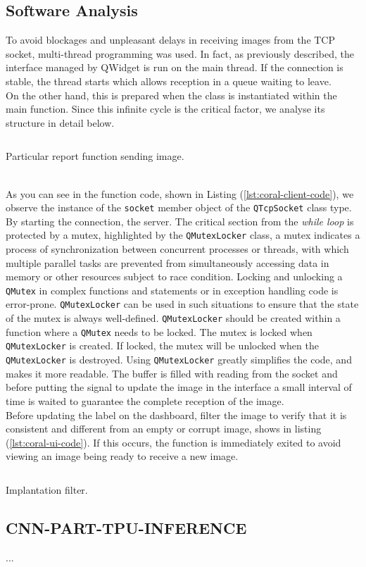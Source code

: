 \subsection{Software Analysis}
\label{ssec:software-coral-analysis}
To avoid blockages and unpleasant delays in receiving images from the TCP
socket, multi-thread programming was used. In fact, as previously described, the
interface managed by QWidget is run on the main thread. If the connection is
stable, the thread starts which allows reception in a queue waiting to leave.\\ 
On the other hand, this is prepared when the class is instantiated within the
main function. Since this infinite cycle is the critical factor, we analyse its
structure in detail below.
%
\begin{listing}[ht] 
\inputminted[frame=lines,framesep=2mm, linenos=true, autogobble, breaklines=true, fontsize=\scriptsize, firstline=12, lastline=26]{c++}{software/code/streamerthread.cpp} 
\caption{Particular report function sending image.} 
\label{lst:coral-client-code} 
\end{listing}
%
\\As you can see in the function code, shown in Listing
(\ref{lst:coral-client-code}), we observe the instance of the \texttt{socket}
member object of the \texttt{QTcpSocket} class type. 
By starting the connection, the server. 
The critical section from the \emph{while loop} is protected by a mutex,
highlighted by the \texttt{QMutexLocker} class, a mutex indicates a
process of synchronization between concurrent processes or threads, with which
multiple parallel tasks are prevented from simultaneously accessing 
data in memory or other resources subject to race condition.\cite{wiki:mutex} \hfill \break
Locking and unlocking a \texttt{QMutex} in complex functions and statements or
in exception handling code is error-prone.
\texttt{QMutexLocker} can be used in such situations to ensure that the state of the
mutex is always well-defined. \texttt{QMutexLocker} should be created within a
function where a \texttt{QMutex} needs to be locked. The mutex is locked when
\texttt{QMutexLocker} is created. If locked, the mutex will be unlocked when
the \texttt{QMutexLocker} is destroyed.
Using \texttt{QMutexLocker} greatly simplifies the code, and makes it more
readable.\cite{Qt:QMutexclass} \hfill \break
The buffer is filled with reading from the socket and before putting the signal
to update the image in the interface a small interval of time is waited to
guarantee the complete reception of the image.\\
Before updating the label on the dashboard, filter the image to verify that it
is consistent and different from an empty or corrupt image, shows in listing
(\ref{lst:coral-ui-code}). 
If this occurs, the function is immediately exited to
avoid viewing an image being ready to receive a new image. 
%
\begin{listing}[ht] 
\inputminted[frame=lines,framesep=2mm, linenos=true, autogobble, breaklines=true, fontsize=\scriptsize, firstline=88, lastline=100]{c++}{software/code/tcpclient.cpp} 
\caption{Implantation filter.} 
\label{lst:coral-ui-code} 
\end{listing}
%
\subsection{CNN-PART-TPU-INFERENCE}
...

